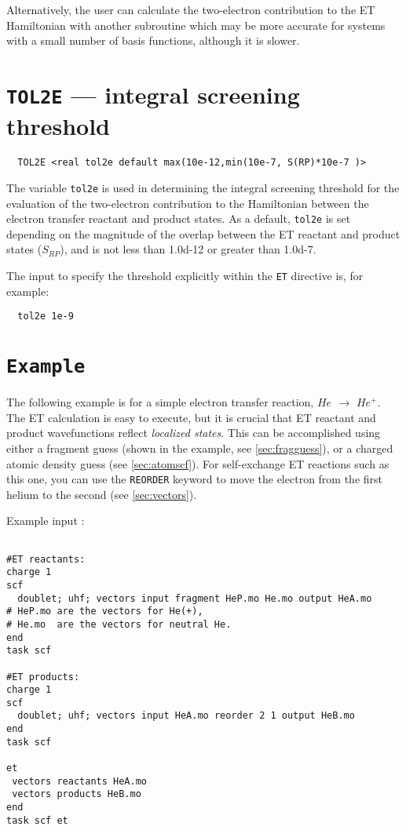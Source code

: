 Alternatively, the user can calculate the two-electron contribution to the ET Hamiltonian
with another subroutine which may be more accurate for systems with a small
number of basis functions, although it is slower.

\section{{\tt TOL2E} --- integral screening threshold}
\label{sec:etranstol2e}

\begin{verbatim}
  TOL2E <real tol2e default max(10e-12,min(10e-7, S(RP)*10e-7 )> 
\end{verbatim}

The variable \verb+tol2e+ is used in determining the integral
screening threshold for the evaluation of the two-electron contribution to the Hamiltonian
between the electron transfer reactant and product states.
As a default, \verb+tol2e+ is set depending on the magnitude
of the overlap between the ET reactant and product states ($S_{RP}$), and is not less than 1.0d-12 
or greater than 1.0d-7.

The input to specify the threshold explicitly within the \verb+ET+
directive is, for example:

\begin{verbatim}
  tol2e 1e-9
\end{verbatim}

\section{{\tt Example}}

The following example is for a simple electron transfer reaction, $He_{}$ $\rightarrow$ $He^{ +}$.
The ET calculation is easy to execute, but it is crucial that ET reactant and product
wavefunctions reflect {\em localized states}. This can be accomplished
using either a fragment guess (shown in the example, see \ref{sec:fragguess}), or a charged atomic
density guess (see \ref{sec:atomscf}). 
For self-exchange ET reactions such as this one, you can use the 
\verb+REORDER+ keyword to move the electron from the first helium to the second (see \ref{sec:vectors}).

Example input :
\begin{verbatim}

#ET reactants:
charge 1
scf 
  doublet; uhf; vectors input fragment HeP.mo He.mo output HeA.mo
# HeP.mo are the vectors for He(+), 
# He.mo  are the vectors for neutral He.
end 
task scf

#ET products:
charge 1
scf 
  doublet; uhf; vectors input HeA.mo reorder 2 1 output HeB.mo
end 
task scf

et
 vectors reactants HeA.mo 
 vectors products HeB.mo
end
task scf et       

\end{verbatim}

